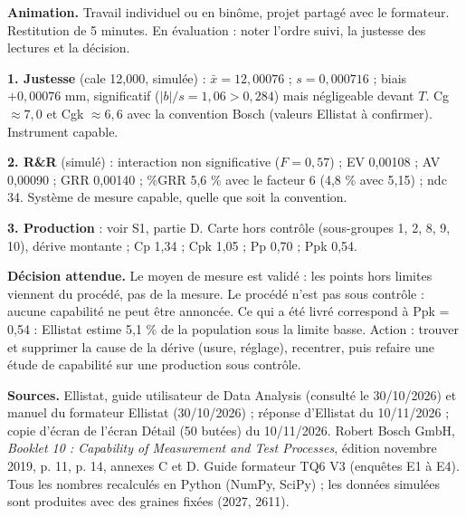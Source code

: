 \documentclass[10pt,a4paper]{article}
\begin{document}
\textbf{Animation.} Travail individuel ou en binôme, projet partagé avec le formateur. Restitution de 5 minutes. En évaluation : noter l'ordre suivi, la justesse des lectures et la décision.
\begin{tcolorbox}[corr]
\textbf{1. Justesse} (cale 12,000, simulée) : $\bar x = 12{,}00076$ ; $s = 0{,}000716$ ; biais $+0{,}00076$ mm, significatif ($\lvert b\rvert/s = 1{,}06 > 0{,}284$) mais négligeable devant $T$. Cg $\approx 7{,}0$ et Cgk $\approx 6{,}6$ avec la convention Bosch (valeurs Ellistat à confirmer). Instrument capable.

\textbf{2. R\&R} (simulé) : interaction non significative ($F = 0{,}57$) ; EV 0,00108 ; AV 0,00090 ; GRR 0,00140 ; \%GRR 5,6 \% avec le facteur 6 (4,8 \% avec 5,15) ; ndc 34. Système de mesure capable, quelle que soit la convention.

\textbf{3. Production} : voir S1, partie D. Carte hors contrôle (sous-groupes 1, 2, 8, 9, 10), dérive montante ; Cp 1,34 ; Cpk 1,05 ; Pp 0,70 ; Ppk 0,54.

\textbf{Décision attendue.} Le moyen de mesure est validé : les points hors limites viennent du procédé, pas de la mesure. Le procédé n'est pas sous contrôle : aucune capabilité ne peut être annoncée. Ce qui a été livré correspond à Ppk = 0,54 : Ellistat estime 5,1 \% de la population sous la limite basse. Action : trouver et supprimer la cause de la dérive (usure, réglage), recentrer, puis refaire une étude de capabilité sur une production sous contrôle.
\end{tcolorbox}

\vfill
{\footnotesize\color{uimm}\textbf{Sources.} Ellistat, guide utilisateur de Data Analysis (consulté le 30/10/2026) et manuel du formateur Ellistat (30/10/2026) ; réponse d'Ellistat du 10/11/2026 ; copie d'écran de l'écran Détail (50 butées) du 10/11/2026. Robert Bosch GmbH, \emph{Booklet 10 : Capability of Measurement and Test Processes}, édition novembre 2019, p. 11, p. 14, annexes C et D. Guide formateur TQ6 V3 (enquêtes E1 à E4). Tous les nombres recalculés en Python (NumPy, SciPy) ; les données simulées sont produites avec des graines fixées (2027, 2611).}
\end{document}

